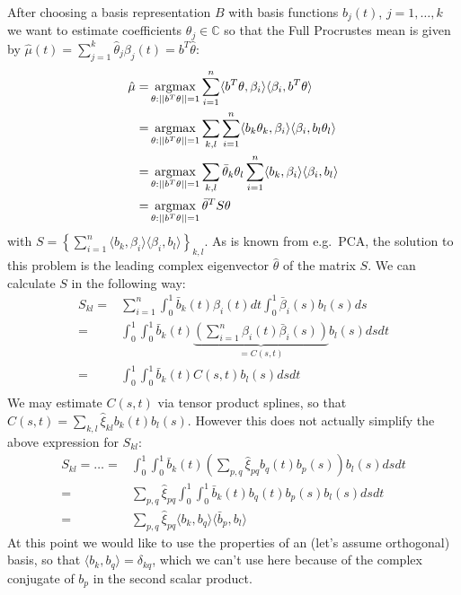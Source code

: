 After choosing a basis representation $B$ with basis functions $b_j(t)$, $j = 1,\dots,k$ we want to estimate coefficients $\theta_j \in \mathbb{C}$ so that the Full Procrustes mean is given by $\hat{\mu}(t) = \sum_{j=1}^k \hat{\theta}_j \beta_j(t) = b^T \hat{\theta}$:
\begin{align*}
  \hat{\mu} =& \operatorname*{argmax}_{\theta : ||b^T\theta||=1} \sum_{i=1}^n \langle b^T\theta, \beta_i \rangle \langle \beta_i, b^T\theta \rangle \\
  =& \operatorname*{argmax}_{\theta : ||b^T\theta||=1} \sum_{k,l} \sum_{i=1}^n \langle b_k \theta_k, \beta_i \rangle \langle \beta_i, b_l \theta_l \rangle \\
  =& \operatorname*{argmax}_{\theta : ||b^T\theta||=1} \sum_{k,l} \bar{\theta}_k \theta_l \sum_{i=1}^n \langle b_k, \beta_i \rangle \langle \beta_i, b_l \rangle \\
  =& \operatorname*{argmax}_{\theta : ||b^T\theta||=1} \bar{\theta}^T S \theta \\
\end{align*}
with $S = \left\{ \sum_{i=1}^n \langle b_k, \beta_i \rangle \langle \beta_i, b_l \rangle \right\}_{k,l}$.
As is known from e.g.\ PCA, the solution to this problem is the leading complex eigenvector $\hat{\theta}$ of the matrix $S$. We can calculate $S$ in the following way:
\begin{align*}
  S_{kl} =& \sum_{i=1}^n \int_0^1 \bar{b}_k(t) \beta_i(t) dt \int_0^1 \bar{\beta}_i(s) b_l(s) ds \\
  =& \int_0^1 \int_0^1 \bar{b}_k(t) \underbrace{\left( \sum_{i=1}^n \beta_i(t) \bar{\beta}_i(s) \right)}_{= C(s,t)} b_l(s) ds dt\\
  =& \int_0^1 \int_0^1 \bar{b}_k(t) C(s,t) b_l(s) ds dt\\
\end{align*}
We may estimate $C(s,t)$ via tensor product splines, so that $\hat{C}(s,t) = \sum_{k,l} \hat{\xi}_{kl} b_k(t) b_l(s)$.
However this does not actually simplify the above expression for $S_{kl}$:
\begin{align*}
  S_{kl} = \dots =& \int_0^1 \int_0^1 \bar{b}_k(t) \left( \sum_{p,q} \hat{\xi}_{pq} b_q(t) b_p(s) \right) b_l(s) ds dt\\
  =& \sum_{p,q} \hat{\xi}_{pq} \int_0^1 \int_0^1 \bar{b}_k(t) b_q(t) b_p(s) b_l(s) ds dt\\
  =& \sum_{p,q} \hat{\xi}_{pq} \langle b_k, b_q \rangle \langle \bar{b}_p, b_l \rangle
\end{align*}
At this point we would like to use the properties of an (let's assume orthogonal) basis, so that $\langle b_k, b_q \rangle = \delta_{kq}$, which we can't use here because of the complex conjugate of $b_p$ in the second scalar product.
